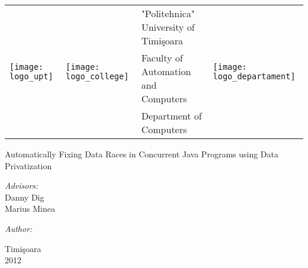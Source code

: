 \graphicspath{{content/title/figures/}}

\begin{titlepage}

\begin{center}

\begin{tabular}{ p{2cm} p{2cm} p{8cm} p{2cm}}
\multirow{3}{*}{\texttt{[image: logo\_upt]}} &
\multirow{3}{*}{\texttt{[image: logo\_college]}} &
"Politehnica" University of Timi\c{s}oara  &
\multirow{3}{*}{\texttt{[image: logo\_departament]}} \\
& & Faculty of Automation and Computers & \\
& & Department of Computers & \\
\end{tabular}

\vspace{5cm}

\Huge

Automatically Fixing Data Races in Concurrent Java Programs using Data
Privatization

\large

\vspace{1.6cm}


\vspace{4cm}

\begin{minipage}{0.55\textwidth}
\begin{flushleft} \large
\emph{Advisors:} \\
{\sc Danny Dig} \\
{\sc Marius Minea}
\end{flushleft}
\end{minipage}
\begin{minipage}{0.4\textwidth}
\begin{flushright} \large
\emph{Author:}\\
\end{flushright}
\end{minipage}


\vfill

\normalsize

Timi\c{s}oara \\
2012

\end{center}

\end{titlepage}